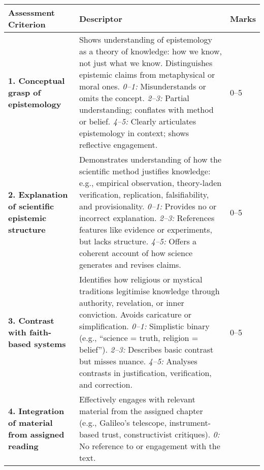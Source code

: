 \documentclass[
  10t,
]{article}
\begin{document}
\begin{small}
\begin{raggedright}
\begin{longtable*}{|p{4.2cm}|p{9cm}|p{1.8cm}|}
\hline
\textbf{Assessment Criterion} & \textbf{Descriptor} & \textbf{Marks} \\
\hline
\textbf{1. Conceptual grasp of epistemology} & 
Shows understanding of epistemology as a theory of knowledge: how we know, not just what we know. Distinguishes epistemic claims from metaphysical or moral ones. \newline
\textit{0–1:} Misunderstands or omits the concept. \newline
\textit{2–3:} Partial understanding; conflates with method or belief. \newline
\textit{4–5:} Clearly articulates epistemology in context; shows reflective engagement. & 
0–5 \\
\hline
\textbf{2. Explanation of scientific epistemic structure} & 
Demonstrates understanding of how the scientific method justifies knowledge: e.g., empirical observation, theory-laden verification, replication, falsifiability, and provisionality. \newline
\textit{0–1:} Provides no or incorrect explanation. \newline
\textit{2–3:} References features like evidence or experiments, but lacks structure. \newline
\textit{4–5:} Offers a coherent account of how science generates and revises claims. & 
0–5 \\
\hline
\textbf{3. Contrast with faith-based systems} & 
Identifies how religious or mystical traditions legitimise knowledge through authority, revelation, or inner conviction. Avoids caricature or simplification. \newline
\textit{0–1:} Simplistic binary (e.g., “science = truth, religion = belief”). \newline
\textit{2–3:} Describes basic contrast but misses nuance. \newline
\textit{4–5:} Analyses contrasts in justification, verification, and correction. & 
0–5 \\
\hline
\textbf{4. Integration of material from assigned reading} & 
Effectively engages with relevant material from the assigned chapter (e.g., Galileo’s telescope, instrument-based trust, constructivist critiques). \newline
\textit{0:} No reference to or engagement with the text. \newline

\end{longtable*}
\end{raggedright}
\end{small}
\end{document}
